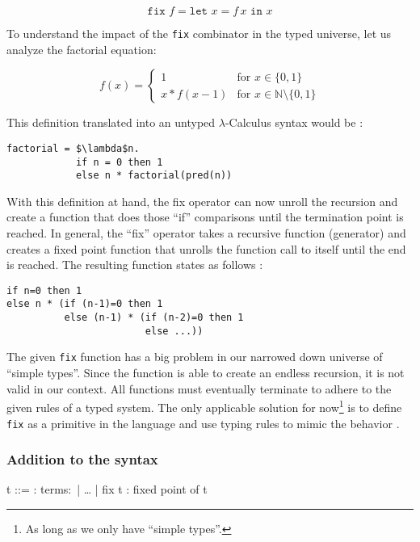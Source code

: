 \begin{equation*}
    \texttt{fix } f = \texttt{let } x = f\,x \texttt{ in } x
\end{equation*}

To understand the impact of the \texttt{fix} combinator in the typed universe, let
us analyze the factorial equation:

\begin{equation*}
    \tag{Recursive Factorial}
    f(x) =
    \begin{cases}
        1          & \text{for } x \in \{0,1\}                      \\
        x * f(x-1) & \text{for } x \in \mathbb{N} \setminus \{0,1\}
    \end{cases}
\end{equation*}

This definition translated into an untyped $\lambda$-Calculus syntax
would be \cite{pierce2002ProgLang}:

\begin{lstlisting}
factorial = $\lambda$n.
            if n = 0 then 1
            else n * factorial(pred(n))
\end{lstlisting}

With this definition at hand, the fix operator can now unroll the recursion
and create a function that does those ``if'' comparisons until the
termination point is reached. In general, the ``fix'' operator
takes a recursive function (generator) and creates a fixed point function that unrolls
the function call to itself until the end is reached.
The resulting function states as follows \cite{pierce2002ProgLang}:

\begin{lstlisting}
if n=0 then 1
else n * (if (n-1)=0 then 1
          else (n-1) * (if (n-2)=0 then 1
                        else ...))
\end{lstlisting}

The given \texttt{fix} function has a big problem in our narrowed down universe
of ``simple types''. Since the function is able to create an endless recursion,
it is not valid in our context. All functions must eventually terminate to adhere
to the given rules of a typed system. The only applicable solution for
now\footnote{As long as we only have ``simple types''.} is to define \texttt{fix}
as a primitive in the language and use typing rules to mimic the behavior
\cite{pierce2002ProgLang}.

\subsubsection{Addition to the syntax \cite{pierce2002ProgLang}}
\begin{bnfgrammar}
    t ::= : terms$\colon$
    | \dots
    | fix t : fixed point of t
\end{bnfgrammar}\leavevmode\newline

